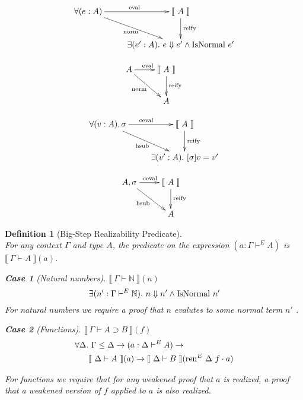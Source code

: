 \documentclass[preprint,nonatbib]{sigplanconf}
\newtheorem{mydfn}{Definition}
\newtheorem{mysubdfn}{Case}
\numberwithin{mysubdfn}{mydfn}
\def\bigstep{\Downarrow}
\def\arr{\supset}
\def\marr{\rightarrow}
\def\app{\cdot}
\def\nat{\mathbb{N}}
\newcommand{\el}[1]{\llbracket ~ #1 ~ \rrbracket}
\newcommand{\fun}[1]{\textmd{#1}}
\newcommand{\typm}[1]{\el{\Gamma \vdash #1}}
\newcommand{\dtypm}[1]{\el{\Delta \vdash #1}}
\newcommand{\type}[1]{\Gamma \vdash^E #1}
\newcommand{\dtype}[1]{\Delta \vdash^E #1}
\newcommand{\ren}[1]{\Gamma \le #1}
\def\dren{\ren{\Delta}}
\begin{document}
\begin{displaymath}
    \xymatrix{
          {\forall (e : A)} 
          \ar[dr]_{\fun{norm}}
          \ar[r]^{\fun{eval}}
        & {\el{A}}
          \ar[d]^{\large{\fun{reify}}}
\\      & {\exists (e' : A). ~ e \bigstep e' \wedge \fun{IsNormal} ~ e'} }
\end{displaymath}

\begin{displaymath}
    \xymatrix{
          {A} 
          \ar[dr]_{\fun{norm}}
          \ar[r]^{\fun{eval}}
        & {\el{A}}
          \ar[d]^{\large{\fun{reify}}}
\\      & {A} }
\end{displaymath}


\begin{displaymath}
    \xymatrix{
          {\forall (v : A), \sigma} 
          \ar[dr]_{\fun{hsub}}
          \ar[r]^{\fun{ceval}}
        & {\el{A}}
          \ar[d]^{\large{\fun{reify}}}
\\      & {\exists (v' : A). ~ [ \sigma ] v = v'} }
\end{displaymath}

\begin{displaymath}
    \xymatrix{
          {A, \sigma} 
          \ar[dr]_{\fun{hsub}}
          \ar[r]^{\fun{ceval}}
        & {\el{A}}
          \ar[d]^{\large{\fun{reify}}}
\\      & {A} }
\end{displaymath}

\begin{mydfn}[Big-Step Realizability Predicate]
$ $\\
For any context $\Gamma$ and type $A$, the predicate on the expression
$(a : \type{A})$ is $\typm{A}(a)$.

\begin{mysubdfn}[Natural numbers]
$\typm{\nat}(n)$
$$
\exists (n' : \type{\nat}).~ n \bigstep n' \wedge \fun{IsNormal} ~ n'
$$
For natural numbers we require a proof that $n$ evalutes to
some normal term $n'$ .
\end{mysubdfn}


\begin{mysubdfn}[Functions]
$\typm{A \arr B}(f)$
\begin{align*}
\forall \Delta.&~ \dren \marr (a : \dtype{A}) \marr \\
&\dtypm{A}(a) \marr \dtypm{B}(\fun{ren}^E ~ \Delta ~ f \app a)
\end{align*}



For functions we require that for any weakened proof that $a$
is realized, a proof that a weakened version of $f$ applied to
$a$ is also realized.
\end{mysubdfn}

\end{mydfn}
\end{document}
